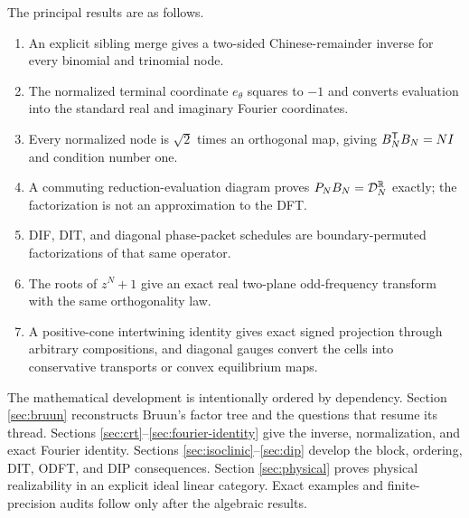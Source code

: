 The principal results are as follows.
\begin{enumerate}
  \item An explicit sibling merge gives a two-sided Chinese-remainder inverse
        for every binomial and trinomial node.
  \item The normalized terminal coordinate $e_\theta$ squares to $-1$ and
        converts evaluation into the standard real and imaginary Fourier
        coordinates.
  \item Every normalized node is $\sqrt{2}$ times an orthogonal map, giving
        $B_N^{\mathsf{T}}B_N=NI$ and condition number one.
  \item A commuting reduction-evaluation diagram proves
        $P_NB_N=\mathcal{D}_N^{\mathbb{R}}$ exactly; the factorization is not an approximation
        to the DFT.
  \item DIF, DIT, and diagonal phase-packet schedules are boundary-permuted
        factorizations of that same operator.
  \item The roots of $z^N+1$ give an exact real two-plane odd-frequency
        transform with the same orthogonality law.
  \item A positive-cone intertwining identity gives exact signed projection
        through arbitrary compositions, and diagonal gauges convert the cells
        into conservative transports or convex equilibrium maps.
\end{enumerate}

The mathematical development is intentionally ordered by dependency.  Section
\ref{sec:bruun} reconstructs Bruun's factor tree and the questions that resume
its thread.  Sections \ref{sec:crt}--\ref{sec:fourier-identity} give the inverse,
normalization, and exact Fourier identity.  Sections
\ref{sec:isoclinic}--\ref{sec:dip} develop the block, ordering, DIT, ODFT, and
DIP consequences.  Section \ref{sec:physical} proves physical realizability in
an explicit ideal linear category.  Exact examples and finite-precision audits
follow only after the algebraic results.
